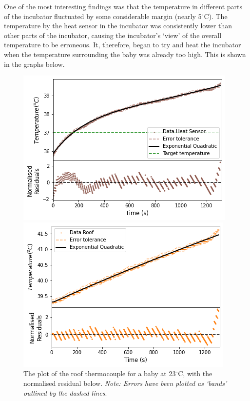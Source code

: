 \documentclass{article}
\begin{document}
\vspace{3mm}

One of the most interesting findings was that the temperature in different parts of the incubator fluctuated by some considerable margin (nearly 5$^{\circ}$C). The temperature by the heat sensor in the incubator was consistently lower than other parts of the incubator, causing the incubator's ‘view’ of the overall temperature to be erroneous. It, therefore, began to try and heat the incubator when the temperature surrounding the baby was already too high. This is shown in the graphs below.


\begin{figure}[H]
\centering
\begin{minipage}{.48\linewidth}
    \captionsetup{justification=centering,margin=0.6cm}
    \includegraphics[width=\linewidth]{Heat sensor 23C.png}
    \caption{The plot of the roof thermocouple for a baby at 23$^{\circ}$C, with the normalised residual below. \textit{Note: Errors have been plotted as ‘bands’ outlined by the dashed lines}.}
\end{minipage}
\hfill
\begin{minipage}{.48\linewidth}
    \captionsetup{justification=centering,margin=0.5cm}
    \includegraphics[width=\linewidth]{Roof 23C.png}

\end{minipage}
\end{figure}
\end{document}

